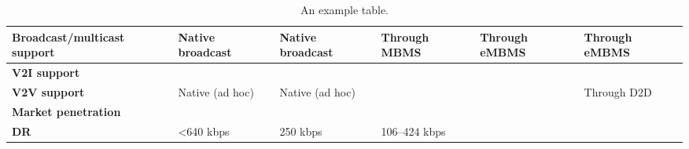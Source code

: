 \begin{table}[h!]
\begin{tabulary}{\columnwidth}{L|L|L|L|L|L}
	\bf{Broadcast/multicast support} & Native broadcast                                      & Native broadcast                                      & Through MBMS                     & Through eMBMS            & Through eMBMS             \\\hline
	\bf{V2I support}                 & \ok                                                   & \ok                                                   & \ok                              & \ok                      & \ok                       \\\hline
	\bf{V2V support}                 & Native (ad hoc)                                       & Native (ad hoc)                                       & \ko                              & \ko                      & Through D2D               \\\hline
	\bf{Market penetration}          & \ok                                                   & \ko                                                   & \ok                              & \ok                      & \ok                       \\\hline
	\bf{\ac{DR}}               	     & <640 kbps                                        & 250 kbps                                              & 106–424 kbps                              & \ok                      & \ok                       \\\hline
	\end{tabulary}
	\caption{\label{tab:Tableppp} An example table.}
\end{table}

